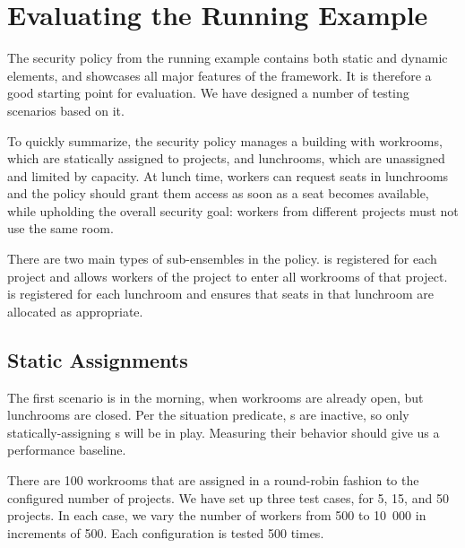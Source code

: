 \section{Evaluating the Running Example}
\label{eval:example}

The security policy from the running example contains both static and dynamic elements,
and showcases all major features of the framework. It is therefore a good starting point
for evaluation. We have designed a number of testing scenarios based on it.

To quickly summarize, the security policy manages a building with workrooms, which are
statically assigned to projects, and lunchrooms, which are unassigned and limited by
capacity. At lunch time, workers can request seats in lunchrooms and the policy should
grant them access as soon as a seat becomes available, while upholding the overall
security goal: workers from different projects must not use the same room.

There are two main types of sub-ensembles in the policy.  is
registered for each project and allows workers of the project to enter all workrooms
of that project.  is registered for each lunchroom and ensures
that seats in that lunchroom are allocated as appropriate.


\subsection{Static Assignments}

The first scenario is in the morning, when workrooms are already open, but lunchrooms
are closed. Per the situation predicate, s are inactive, so only
statically-assigning s will be in play. Measuring their behavior
should give us a performance baseline.

There are 100 workrooms that are assigned in a round-robin fashion to the configured
number of projects. We have set up three test cases, for 5, 15, and 50 projects. In each
case, we vary the number of workers from 500 to 10~000 in increments of 500. Each
configuration is tested 500 times.

